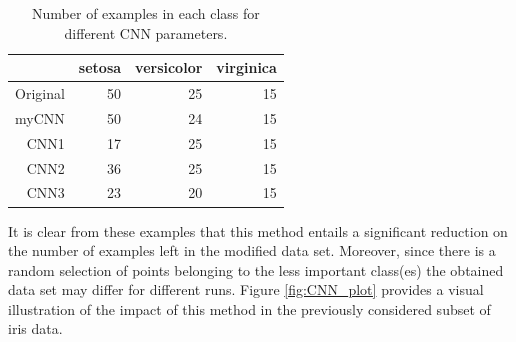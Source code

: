 \documentclass[10pt,a4paper]{article}\usepackage[]{graphicx}\usepackage[]{color}
\begin{document}
\begin{table}[ht]
\centering
\begin{tabular}{rrrr}
  \hline
 & setosa & versicolor & virginica \\ 
  \hline
Original &  50 &  25 &  15 \\ 
  myCNN &  50 &  24 &  15 \\ 
  CNN1 &  17 &  25 &  15 \\ 
  CNN2 &  36 &  25 &  15 \\ 
  CNN3 &  23 &  20 &  15 \\ 
   \hline
\end{tabular}
\caption{Number of examples in each class for different CNN parameters.} 
\label{tab:CNN_table}
\end{table}




It is clear from these examples that this method entails a significant reduction on the number of examples left in the modified data set. Moreover, since there is a random selection of points belonging to the less important class(es) the obtained data set may differ for different runs. Figure \ref{fig:CNN_plot} provides a visual illustration of the impact of this method in the previously considered subset of iris data.
\end{document}
